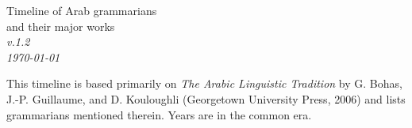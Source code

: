 \documentclass[a4paper,landscape]{article}
\begin{document}
\thispagestyle{empty}

\begin{minipage}[t]{.4\textwidth}
{\LARGE Timeline of Arab grammarians\\and their major works}\\[\medskipamount]
\textit{v.1.2\\\today}
\end{minipage}
\hfill
\begin{minipage}[t]{.38\textwidth}
This timeline is based primarily on \textit{The Arabic Linguistic Tradition} by G. Bohas, \mbox{J.-P.} Guillaume, and D. Kouloughli (Georgetown University Press, 2006) and lists grammarians mentioned therein. Years are in the common era.
\end{minipage}


\vfill
\end{document}
